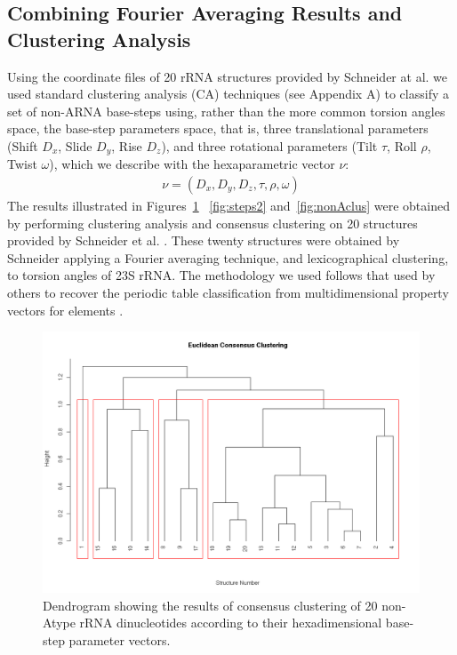 \subsection{Combining Fourier Averaging Results and Clustering Analysis}
Using  the  coordinate  files  of  20  rRNA  structures  provided  by
Schneider  at  al.\cite{schneider2004}  we  used  standard  clustering
analysis  (CA)  techniques (see  Appendix  A)  to  classify a  set  of
non-ARNA base-steps using, rather  than the more common torsion angles
space, the  base-step parameters  space, that is,  three translational
parameters  (Shift   $D_x$,  Slide  $D_y$,  Rise   $D_z$),  and  three
rotational  parameters  (Tilt $\tau$,  Roll  $\rho$, Twist  $\omega$),
which we describe with the hexaparametric vector $\nu$:
\begin{gather}
 \nu = (D_x, D_y, D_z, \tau, \rho, \omega)
\end{gather}
The     results     illustrated     in     Figures~\ref{fig:eucl_cons}
~\ref{fig:steps2}  and~\ref{fig:nonAclus} were obtained  by performing
clustering analysis and consensus clustering on 20 structures provided
by  Schneider et al.   \cite{schneider2004}.  These  twenty structures
were obtained by Schneider applying a Fourier averaging technique, and
lexicographical  clustering,  to  torsion  angles of  23S  rRNA.   The
methodology  we  used follows  that  used  by  others to  recover  the
periodic table  classification from multidimensional  property vectors
for elements \cite{restrepo2004, restrepo2006}.
\begin{figure}[htbp]
 \centering
\includegraphics[angle=90, scale=0.6]{Chapter2/eucli_cons_nonA-RNA.png}
\caption{Dendrogram showing the results  of consensus clustering of 20
non-Atype  rRNA  dinucleotides   according  to  their  hexadimensional
base-step parameter vectors.}
 \label{fig:eucl_cons}
\end{figure}

